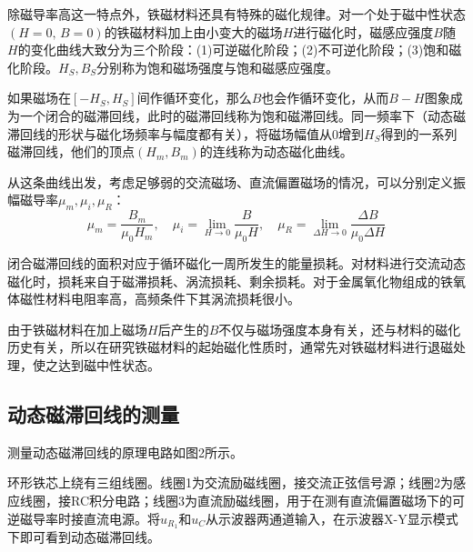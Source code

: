 \documentclass[UTF-8,twoside,cs4size]{ctexart}
\begin{document}
	除磁导率高这一特点外，铁磁材料还具有特殊的磁化规律。对一个处于磁中性状态$ (H=0,\,B=0) $的铁磁材料加上由小变大的磁场$ H $进行磁化时，磁感应强度$ B $随$ H $的变化曲线大致分为三个阶段：(1)可逆磁化阶段；(2)不可逆化阶段；(3)饱和磁化阶段。$ H_S,B_S $分别称为饱和磁场强度与饱和磁感应强度。
	
	如果磁场在$ [-H_S,H_S] $间作循环变化，那么$ B $也会作循环变化，从而$ B-H $图象成为一个闭合的磁滞回线，此时的磁滞回线称为饱和磁滞回线。同一频率下（动态磁滞回线的形状与磁化场频率与幅度都有关），将磁场幅值从0增到$ H_S $得到的一系列磁滞回线，他们的顶点$ (H_m,B_m) $的连线称为动态磁化曲线。
	
	从这条曲线出发，考虑足够弱的交流磁场、直流偏置磁场的情况，可以分别定义振幅磁导率$ \mu_m,\mu_i,\mu_R $：
	\[\mu_m=\frac{B_m}{\mu_0H_m},\quad\mu_i=\lim_{H\to0}\frac{B}{\mu_0H},\quad\mu_R=\lim_{\Delta H\to 0}\frac{\Delta B}{\mu_0\Delta H}\]
	
	闭合磁滞回线的面积对应于循环磁化一周所发生的能量损耗。对材料进行交流动态磁化时，损耗来自于磁滞损耗、涡流损耗、剩余损耗。对于金属氧化物组成的铁氧体磁性材料电阻率高，高频条件下其涡流损耗很小。
	
	由于铁磁材料在加上磁场$ H $后产生的$ B $不仅与磁场强度本身有关，还与材料的磁化历史有关，所以在研究铁磁材料的起始磁化性质时，通常先对铁磁材料进行退磁处理，使之达到磁中性状态。
	\subsection{动态磁滞回线的测量}
	测量动态磁滞回线的原理电路如图2所示。
	
	环形铁芯上绕有三组线圈。线圈1为交流励磁线圈，接交流正弦信号源；线圈2为感应线圈，接RC积分电路；线圈3为直流励磁线圈，用于在测有直流偏置磁场下的可逆磁导率时接直流电源。将$ u_{R_1} $和$ u_C $从示波器两通道输入，在示波器X-Y显示模式下即可看到动态磁滞回线。
	
\end{document}
